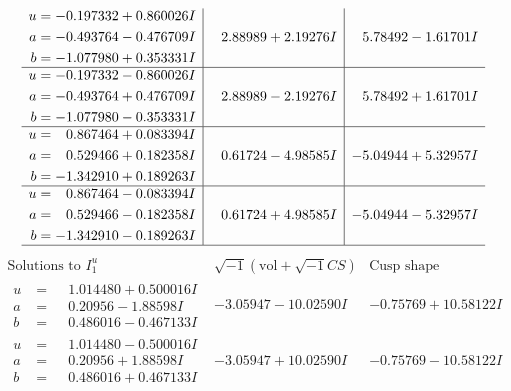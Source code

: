 \documentclass[1p]{elsarticle_modified}
\theoremstyle{definition}
\newcommand{\I}{\sqrt{-1}}
\begin{document}
$$\begin{array}{c|c|c}
\begin{aligned}
u &= -0.197332 + 0.860026 I \\
a &= -0.493764 - 0.476709 I \\
b &= -1.077980 + 0.353331 I\end{aligned}
 & \phantom{-}2.88989 + 2.19276 I & \phantom{-}5.78492 - 1.61701 I \\ \hline\begin{aligned}
u &= -0.197332 - 0.860026 I \\
a &= -0.493764 + 0.476709 I \\
b &= -1.077980 - 0.353331 I\end{aligned}
 & \phantom{-}2.88989 - 2.19276 I & \phantom{-}5.78492 + 1.61701 I \\ \hline\begin{aligned}
u &= \phantom{-}0.867464 + 0.083394 I \\
a &= \phantom{-}0.529466 + 0.182358 I \\
b &= -1.342910 + 0.189263 I\end{aligned}
 & \phantom{-}0.61724 - 4.98585 I & -5.04944 + 5.32957 I \\ \hline\begin{aligned}
u &= \phantom{-}0.867464 - 0.083394 I \\
a &= \phantom{-}0.529466 - 0.182358 I \\
b &= -1.342910 - 0.189263 I\end{aligned}
 & \phantom{-}0.61724 + 4.98585 I & -5.04944 - 5.32957 I\\
 \hline 
 \end{array}$$\newpage$$\begin{array}{c|c|c}  
\text{Solutions to }I^u_{1}& \I (\text{vol} + \sqrt{-1}CS) & \text{Cusp shape}\\
 \hline 
\begin{aligned}
u &= \phantom{-}1.014480 + 0.500016 I \\
a &= \phantom{-}0.20956 - 1.88598 I \\
b &= \phantom{-}0.486016 - 0.467133 I\end{aligned}
 & -3.05947 - 10.02590 I & -0.75769 + 10.58122 I \\ \hline\begin{aligned}
u &= \phantom{-}1.014480 - 0.500016 I \\
a &= \phantom{-}0.20956 + 1.88598 I \\
b &= \phantom{-}0.486016 + 0.467133 I\end{aligned}
 & -3.05947 + 10.02590 I & -0.75769 - 10.58122 I \\ \hline\begin{aligned}

\end{aligned}
\end{array}$$
\end{document}
